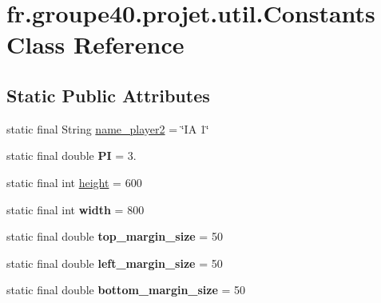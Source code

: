 \hypertarget{classfr_1_1groupe40_1_1projet_1_1util_1_1_Constants}{}\section{fr.\+groupe40.\+projet.\+util.\+Constants Class Reference}
\label{classfr_1_1groupe40_1_1projet_1_1util_1_1_Constants}
\subsection*{Static Public Attributes}
\begin{DoxyCompactItemize}
\item 
static final String \mbox{\hyperlink{classfr_1_1groupe40_1_1projet_1_1util_1_1_Constants_ab635bb52f76d0eca60948b28f369c44a}{name\+\_\+player2}} = \char`\"{}IA 1\char`\"{}
\item 
\mbox{\label{classfr_1_1groupe40_1_1projet_1_1util_1_1_Constants_a0d653b2ffa1ca80cc1510aa3986f1491}} 
static final double {\bfseries PI} = 3.
\item 
static final int \mbox{\hyperlink{classfr_1_1groupe40_1_1projet_1_1util_1_1_Constants_ab2f05167d177fd89c1251e2dc9d153e6}{height}} = 600
\item 
\mbox{\label{classfr_1_1groupe40_1_1projet_1_1util_1_1_Constants_a11b7ce28d3b08c7c2b041c6ce68e884d}} 
static final int {\bfseries width} = 800
\item 
\mbox{\label{classfr_1_1groupe40_1_1projet_1_1util_1_1_Constants_adb40bbe9bd7532c889179c0cd39c31e1}} 
static final double {\bfseries top\+\_\+margin\+\_\+size} = 50
\item 
\mbox{\label{classfr_1_1groupe40_1_1projet_1_1util_1_1_Constants_a7a7e80ef5b565c110c85173464a3ee98}} 
static final double {\bfseries left\+\_\+margin\+\_\+size} = 50
\item 
\mbox{\label{classfr_1_1groupe40_1_1projet_1_1util_1_1_Constants_add8a472b939e065fe0776dbca5540c96}} 
static final double {\bfseries bottom\+\_\+margin\+\_\+size} = 50

\end{DoxyCompactItemize}
